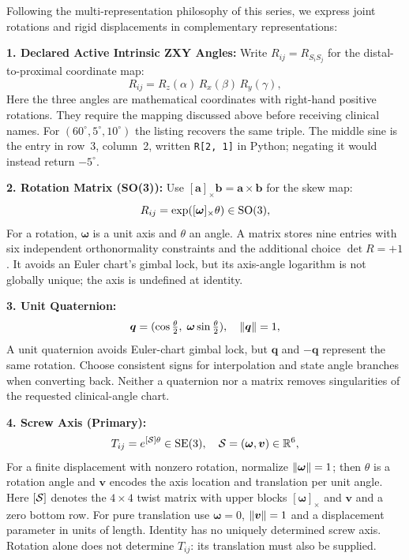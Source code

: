 Following the multi-representation philosophy of this series, we express joint
rotations and rigid displacements in complementary representations:

\textbf{1. Declared Active Intrinsic ZXY Angles:}
Write $R_{ij}=R_{S_iS_j}$ for the distal-to-proximal coordinate map:
\begin{equation}
  R_{ij} = R_z(\alpha) \, R_x(\beta) \, R_y(\gamma),
  \label{eq:ch2:euler-isb}
\end{equation}
Here the three angles are mathematical coordinates with right-hand positive
rotations. They require the mapping discussed above before receiving clinical
names. For $(60^\circ,5^\circ,10^\circ)$ the listing recovers the same triple.
The middle sine is the entry in row~3, column~2, written \texttt{R[2, 1]}
in Python; negating it would instead return $-5^\circ$.

\textbf{2. Rotation Matrix (SO(3)):}
Use $[\bm{a}]_\times\bm{b}=\bm{a}\times\bm{b}$ for the skew map:
\begin{equation}
  R_{ij} = \exp([\bm{\omega}]_\times \theta) \in \mathrm{SO}(3),
  \label{eq:ch2:rotmat}
\end{equation}
For a rotation, $\bm{\omega}$ is a unit axis and $\theta$ an angle. A matrix
stores nine entries with six independent orthonormality constraints and the
additional choice $\det R=+1$. It avoids an Euler chart's gimbal lock, but its
axis-angle logarithm is not globally unique; the axis is undefined at identity.

\textbf{3. Unit Quaternion:}
\begin{equation}
  \bm{q} = (\cos\tfrac{\theta}{2},\; \bm{\omega}\sin\tfrac{\theta}{2}),
  \quad \left\lVert \bm{q} \right\rVert = 1,
  \label{eq:ch2:quaternion}
\end{equation}
A unit quaternion avoids Euler-chart gimbal lock, but $\bm{q}$ and $-\bm{q}$
represent the same rotation. Choose consistent signs for interpolation and
state angle branches when converting back. Neither a quaternion nor a matrix
removes singularities of the requested clinical-angle chart.

\textbf{4. Screw Axis (Primary):}
\begin{equation}
  T_{ij} = e^{[\mathcal{S}]\theta} \in \mathrm{SE}(3),
  \quad \mathcal{S} = (\bm{\omega}, \bm{v}) \in \mathbb{R}^6,
  \label{eq:ch2:screw}
\end{equation}
For a finite displacement with nonzero rotation, normalize
$\left\lVert \bm{\omega} \right\rVert=1$; then $\theta$ is a rotation angle and $\bm{v}$ encodes
the axis location and translation per unit angle. Here $[\mathcal{S}]$ denotes
the $4\times4$ twist matrix with upper blocks $[\bm{\omega}]_\times$ and
$\bm{v}$ and a zero bottom row. For pure translation use
$\bm{\omega}=0$, $\left\lVert \bm{v} \right\rVert=1$ and a displacement parameter in units of
length. Identity has no uniquely determined screw axis. Rotation alone does
not determine $T_{ij}$: its translation must also be supplied.

